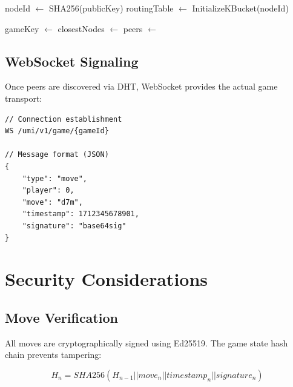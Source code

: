 \documentclass[11pt,a4paper]{article}
\begin{document}
\begin{algorithm}
\caption{UMI Peer Discovery via DHT}
\begin{algorithmic}[1]
    \State nodeId $\leftarrow$ SHA256(publicKey)
    \State routingTable $\leftarrow$ InitializeKBucket(nodeId)
        \State {}
        \State {}
    \EndFor
    \State {}
\EndProcedure

    \State gameKey $\leftarrow$ 
    \State closestNodes $\leftarrow$ 
        \State peers $\leftarrow$ 
            \State \Return {}
        \EndIf
    \EndFor
    \State {}
    \State \Return {}
\EndProcedure
\end{algorithmic}
\end{algorithm}

\subsection{WebSocket Signaling}

Once peers are discovered via DHT, WebSocket provides the actual game transport:

\begin{lstlisting}
// Connection establishment
WS /umi/v1/game/{gameId}

// Message format (JSON)
{
    "type": "move",
    "player": 0,
    "move": "d7m",
    "timestamp": 1712345678901,
    "signature": "base64sig"
}
\end{lstlisting}

\section{Security Considerations}

\subsection{Move Verification}

All moves are cryptographically signed using Ed25519. The game state hash chain prevents tampering:

\begin{equation}
H_n = SHA256(H_{n-1} || move_n || timestamp_n || signature_n)
\end{equation}
\end{document}
